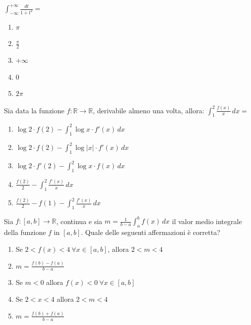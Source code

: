 \begin{quiz}
$\displaystyle\int_{-\infty}^{+\infty}\frac{dt}{1+t^2}=$

\begin{enumerate}
\item $\pi$
\item $\frac\pi2$
\item $+\infty$
\item $0$
\item $2\pi$
\end{enumerate}
\end{quiz}

\begin{quiz}
Sia data la funzione $f:\mathbb R\to\mathbb R$, derivabile almeno una volta, allora: $\displaystyle\int_1^2\frac{f(x)}{x}\,dx=$

\begin{enumerate}
\item $\log2\cdot f(2)-\int_1^2\log x\cdot f\prime(x)\,dx$
\item $\log2\cdot f(2)-\int_1^2\log|x|\cdot f\prime(x)\,dx$
\item $\log2\cdot f\prime(2)-\int_1^2\log x\cdot f(x)\,dx$
\item $\frac{f(2)}2-\int_1^2\frac{f\prime(x)}x\,dx$
\item $\frac{f(2)}2-f(1)-\int_1^2\frac{f\prime(x)}x\,dx$
\end{enumerate}
\end{quiz}

\begin{quiz}
Sia $f:[a,b]\to\mathbb R$, continua e sia $m=\displaystyle\frac1{b-a}\int_a^b f(x)\,dx$ il valor medio integrale della funzione $f$ in $[a,b]$. Quale delle seguenti affermazioni è corretta?

\begin{enumerate}
\item Se $2<f(x)<4\ \forall x\in[a,b]$, allora $2<m<4$
\item $m=\frac{f(b)-f(a)}{b-a}$
\item Se $m<0$ allora $f(x)<0\ \forall x\in[a,b]$
\item Se $2<x<4$ allora $2<m<4$
\item $m=\frac{f(b)+f(a)}{b-a}$
\end{enumerate}
\end{quiz}

